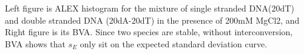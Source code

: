 Left figure is ALEX histogram for the mixture of single stranded DNA(20dT) and double stranded DNA (20dA-20dT) in the presence of 200mM MgCl2, and Right figure is its BVA. Since two species are stable, without interconversion, BVA shows that $s_E$ only sit on the expected standard deviation curve.   